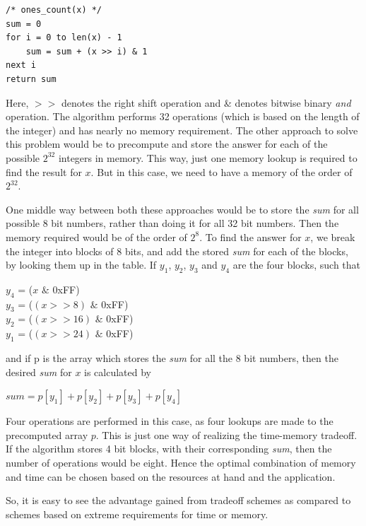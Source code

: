 \begin{lstlisting}[frame=tb]
/* ones_count(x) */
sum = 0
for i = 0 to len(x) - 1
    sum = sum + (x >> i) & 1
next i
return sum
\end{lstlisting}

Here, $>>$ denotes the right shift operation and \& denotes bitwise binary \emph{and} operation. The algorithm performs 32 operations (which is based on the length of the integer) and has nearly no memory requirement. The other approach to solve this problem would be to precompute and store the answer for each of the possible $2^{32}$ integers in memory. This way, just one memory lookup is required to find the result for $x$. But in this case, we need to have a memory of the order of $2^{32}$. 

One middle way between both these approaches would be to store the \textit{sum} for all possible 8 bit numbers, rather than doing it for all 32 bit numbers. Then the memory required would be of the order of $2^{8}$. To find the answer for $x$, we break the integer into blocks of 8 bits, and add the stored \textit{sum} for each of the blocks, by looking them up in the table. If $y_1$, $y_2$, $y_3$ and $y_4$ are the four blocks, such that

\begin{center}
$y_4$ = ($x$ $\&$ $0$xFF)\\
$y_3$ = ($(x >> 8)$ $\&$ $0$xFF)\\ 
$y_2$ = ($(x >> 16)$ $\&$ $0$xFF)\\ 
$y_1$ = ($(x >> 24)$ $\&$ $0$xFF)\\
\end{center}

and if p is the array which stores the \textit{sum} for all the 8 bit numbers, then the desired \textit{sum} for $x$ is calculated by

\begin{center}
$sum = p[y_1] + p[y_2] + p[y_3] + p[y_4]$\\
\end{center}

Four operations are performed in this case, as four lookups are made to the precomputed array $p$. This is just one way of realizing the time-memory tradeoff. If the algorithm stores 4 bit blocks, with their corresponding \textit{sum}, then the number of operations would be eight. Hence the optimal combination of memory and time can be chosen based on the resources at hand and the application. 

So, it is easy to see the advantage gained from tradeoff schemes as compared to schemes based on extreme requirements for time or memory. 


